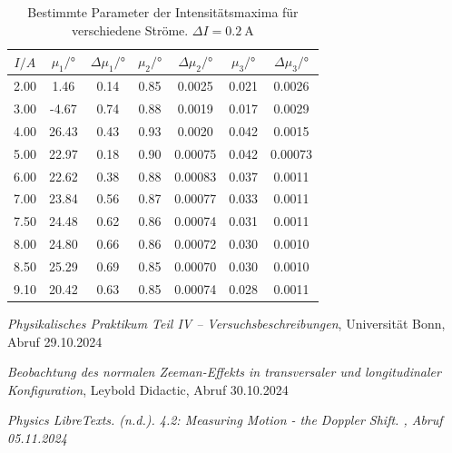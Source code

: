 \documentclass{article}
\begin{document}
\begin{table}[h]
  \centering
  \begin{tabular}{|ccccccc|}
    \toprule
    {$I/\si{A}$} & {$\mu_1/\si{\degree}$} & {$\Delta \mu_1/\si{\degree}$} & {$\mu_2/\si{\degree}$} & {$\Delta \mu_2/\si{\degree}$} & {$\mu_3/\si{\degree}$} & {$\Delta \mu_3/\si{\degree}$} \\
    \midrule
      2.00 & 1.46 & 0.14 & 0.85 & 0.0025 & 0.021 & 0.0026 \\
      3.00 & -4.67 & 0.74 & 0.88 & 0.0019 & 0.017 & 0.0029 \\
      4.00 & 26.43 & 0.43 & 0.93 & 0.0020 & 0.042 & 0.0015 \\
      5.00 & 22.97 & 0.18 & 0.90 & 0.00075 & 0.042 & 0.00073 \\
      6.00 & 22.62 & 0.38 & 0.88 & 0.00083 & 0.037 & 0.0011 \\
      7.00 & 23.84 & 0.56 & 0.87 & 0.00077 & 0.033 & 0.0011 \\
      7.50 & 24.48 & 0.62 & 0.86 & 0.00074 & 0.031 & 0.0011 \\
      8.00 & 24.80 & 0.66 & 0.86 & 0.00072 & 0.030 & 0.0010 \\
      8.50 & 25.29 & 0.69 & 0.85 & 0.00070 & 0.030 & 0.0010 \\
      9.10 & 20.42 & 0.63 & 0.85 & 0.00074 & 0.028 & 0.0011 \\
    \bottomrule
  \end{tabular}
  \caption{Bestimmte Parameter der Intensitätsmaxima für verschiedene Ströme. $\Delta I=\SI{0.2}{\A}$}
  \label{tab:parameter}
\end{table}



\begin{thebibliography}{9}

\textit{Physikalisches Praktikum Teil IV -- Versuchsbeschreibungen}, Universität Bonn, Abruf 29.10.2024

\textit{Beobachtung des normalen Zeeman-Effekts in transversaler und longitudinaler Konfiguration}, Leybold Didactic, Abruf 30.10.2024

\textit{Physics LibreTexts. (n.d.). 4.2: Measuring Motion - the Doppler Shift. , Abruf 05.11.2024}
\label{einheit}
\end{thebibliography}
\end{document}
